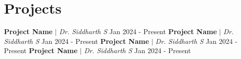 \section{\textbf{Projects}}
\resumeSubHeadingListStart

    \expSubheading
   {\textbf{Project Name} $|$ \textit{Dr. Siddharth S}} {Jan 2024 - Present} 
    \resumeItemListStart
    \resumeItemListEnd
       \expSubheading
   {\textbf{Project Name} $|$ \textit{Dr. Siddharth S}} {Jan 2024 - Present} 
    \resumeItemListStart
    \resumeItemListEnd
        \expSubheading
   {\textbf{Project Name} $|$ \textit{Dr. Siddharth S}} {Jan 2024 - Present} 
    \resumeItemListStart
    \resumeItemListEnd
        \expSubheading
   {\textbf{Project Name} $|$ \textit{Dr. Siddharth S}} {Jan 2024 - Present} 
    \resumeItemListStart
    \resumeItemListEnd

\resumeSubHeadingListEnd